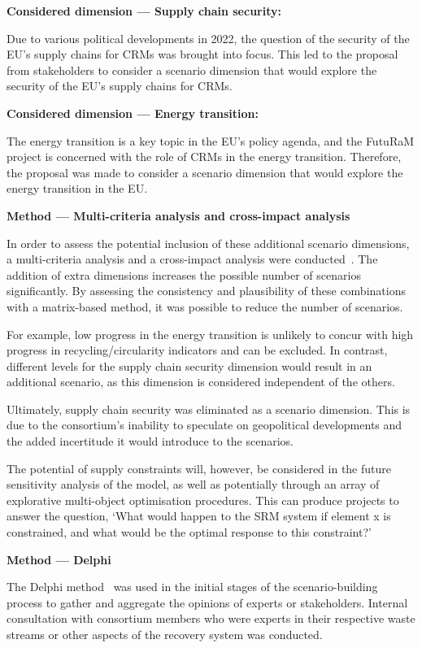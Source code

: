 \textbf{Considered dimension --- Supply chain security:}

Due to various political developments in 2022, the question of the security of the EU's supply chains for CRMs was brought into focus. This led to the proposal from stakeholders to consider a scenario dimension that would explore the security of the EU's supply chains for CRMs.


\textbf{Considered dimension --- Energy transition:}

The energy transition is a key topic in the EU's policy agenda, and the FutuRaM project is concerned with the role of CRMs in the energy transition. Therefore, the proposal was made to consider a scenario dimension that would explore the energy transition in the EU.\@


\textbf{Method --- Multi-criteria analysis and cross-impact analysis}

In order to assess the potential inclusion of these additional scenario dimensions, a multi-criteria analysis and a cross-impact analysis were conducted~\cite{steubing2016matrix}. The addition of extra dimensions increases the possible number of scenarios significantly. By assessing the consistency and plausibility of these combinations with a matrix-based method, it was possible to reduce the number of scenarios.

For example, low progress in the energy transition is unlikely to concur with high progress in recycling/circularity indicators and can be excluded. In contrast, different levels for the supply chain security dimension would result in an additional scenario, as this dimension is considered independent of the others.

Ultimately, supply chain security was eliminated as a scenario dimension. This is due to the consortium's inability to speculate on geopolitical developments and the added incertitude it would introduce to the scenarios.

The potential of supply constraints will, however, be considered in the future sensitivity analysis of the model, as well as potentially through an array of explorative multi-object optimisation procedures. This can produce projects to answer the question, `What would happen to the SRM system if element x is constrained, and what would be the optimal response to this constraint?'


\textbf{Method --- Delphi}

The Delphi method~\cite{hsu2019delphi} was used in the initial stages of the scenario-building process to gather and aggregate the opinions of experts or stakeholders. Internal consultation with consortium members who were experts in their respective waste streams or other aspects of the recovery system was conducted.

